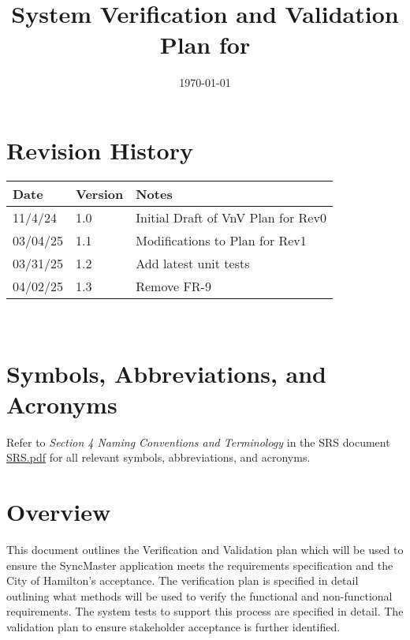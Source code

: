 \documentclass[12pt, titlepage]{article}
\begin{document}
\title{System Verification and Validation Plan for \progname{}}
\author{\authname}
\date{\today}

\maketitle


\section*{Revision History}

\begin{tabularx}{\textwidth}{p{3cm}p{2cm}X}
  \toprule {\bf Date} & {\bf Version} & {\bf Notes}\\
  \midrule
  11/4/24 & 1.0 & Initial Draft of VnV Plan for Rev0\\
  03/04/25 & 1.1 & Modifications to Plan for Rev1\\
  03/31/25 & 1.2 & Add latest unit tests\\
  04/02/25 & 1.3 & Remove FR-9\\
  \bottomrule
\end{tabularx}

~\\

\newpage

\tableofcontents

\listoftables

\section*{Symbols, Abbreviations, and Acronyms}

Refer to \textit{Section 4 Naming Conventions and Terminology} in the
SRS document
\href{https://github.com/Spitgranger/SyncMaster/blob/main/docs/SRS-Volere/SRS.pdf}{SRS.pdf}
for all relevant symbols, abbreviations, and acronyms.

\newpage


\section{Overview}

This document outlines the Verification and Validation plan which will be used
to ensure the SyncMaster application meets the requirements specification
and the City of Hamilton's acceptance. The verification plan is specified
in detail outlining what methods will be used to verify the
functional and non-functional
requirements. The system tests to support this process are specified in detail.
The validation plan to ensure stakeholder acceptance is further identified.
\end{document}
